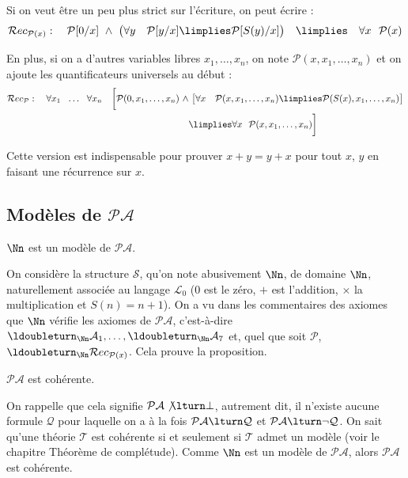 \documentclass[11pt,class=report,crop=false]{standalone}
\begin{document}
\begin{remarque*}
Si on veut être un peu plus strict sur l'écriture, on peut écrire :
\[ \mathcal{R}ec_{\mathcal{P}(x)} : \quad \mathcal{P}[0/x] \ \land \ \big(\forall y \quad \mathcal{P}[y/x] \limplies \mathcal{P}[S(y)/x]\big) \quad \limplies \quad \forall x \ \  \mathcal{P}(x) \]

En plus, si on a d'autres variables libres $x_1, \dots, x_n$, on note $\mathcal{P}(x, x_1, \dots, x_n)$ et on ajoute les quantificateurs universels au début :
\[ 
\begin{split}
	\mathcal{R}ec_{\mathcal{P}} : \quad \forall x_1 \ \ \dots \ \ \forall x_n \quad \bigg[  \mathcal{P}(0,x_1, \dots, x_n) \ \land & \ \big[\forall x \quad \mathcal{P}(x,x_1, \dots, x_n) \limplies \mathcal{P}(S(x),x_1, \dots, x_n)\big] \\
	& \limplies \forall x \ \ \mathcal{P}(x,x_1, \dots, x_n) \bigg]
\end{split}
\]

Cette version est indispensable pour prouver $x+y=y+x$ pour tout $x$, $y$ en faisant une récurrence sur $x$.
\end{remarque*}

\subsection{Modèles de $\mathcal{PA}$}

\begin{proposition}
	$\Nn$ est un modèle de $\mathcal{PA}$.
\end{proposition}

On considère la structure $\mathcal{S}$, qu'on note abusivement $\Nn$, de domaine $\Nn$, naturellement associée au langage $\mathcal{L}_0$ ($0$ est le zéro, $+$ est l'addition, $\times$ la multiplication et $S(n)=n+1$).
On a vu dans les commentaires des axiomes que $\Nn$ vérifie les axiomes de $\mathcal{PA}$, c'est-à-dire $\ldoubleturn_{\Nn} \mathcal{A}_1, \dots, \ldoubleturn_{\Nn} \mathcal{A}_7$ et, quel que soit $\mathcal{P}$, $\ldoubleturn_{\Nn} \mathcal{R}ec_{\mathcal{P}(x)}$. Cela prouve la proposition.

\begin{corollaire}
	$\mathcal{PA}$ est cohérente.
\end{corollaire}

On rappelle que cela signifie $\mathcal{PA} \not\lturn \bot$, autrement dit, il n'existe aucune formule $\mathcal{Q}$ pour laquelle on a à la fois $\mathcal{PA} \lturn \mathcal{Q}$ et $\mathcal{PA} \lturn \lnot \mathcal{Q}$.
On sait qu'une théorie $\mathcal{T}$ est cohérente si et seulement si $\mathcal{T}$ admet un modèle (voir le chapitre \og{}Théorème de complétude\fg{}). Comme $\Nn$ est un modèle de $\mathcal{PA}$, alors $\mathcal{PA}$ est cohérente.
\end{document}
